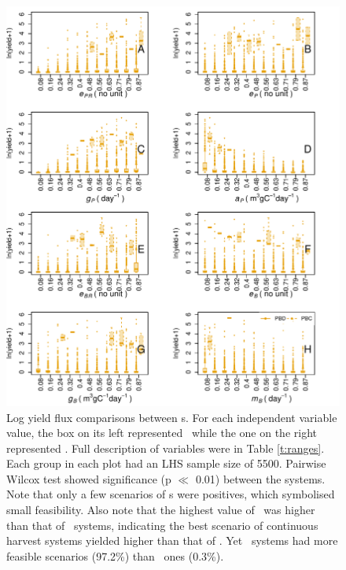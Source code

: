 \documentclass[../thesis.tex]{subfiles} %
\begin{document}
\begin{figure}[H]
    \centering
    \includegraphics[width=\linewidth]{result/harvB.pdf}
    \caption[Log yield flux comparisons between \pbs s]{Log yield flux comparisons between \pbs s.  For each independent variable value, the box on its left represented \PBN\ while the one on the right represented \PBH.  Full description of variables were in Table \ref{t:ranges}.  Each group in each plot had an LHS sample size of 5500.  Pairwise Wilcox test showed significance (p $\ll$ 0.01) between the systems.  Note that only a few scenarios of \pbs s were positives, which symbolised small feasibility.  Also note that the highest value of \PBH\ was higher than that of \PBN\ systems, indicating the best scenario of continuous harvest systems yielded higher than that of \PBN.  Yet \PBN\ systems had more feasible scenarios (97.2\%) than \PBH\ ones (0.3\%).}
    \label{f:harvPB}
\end{figure}
\end{document}

